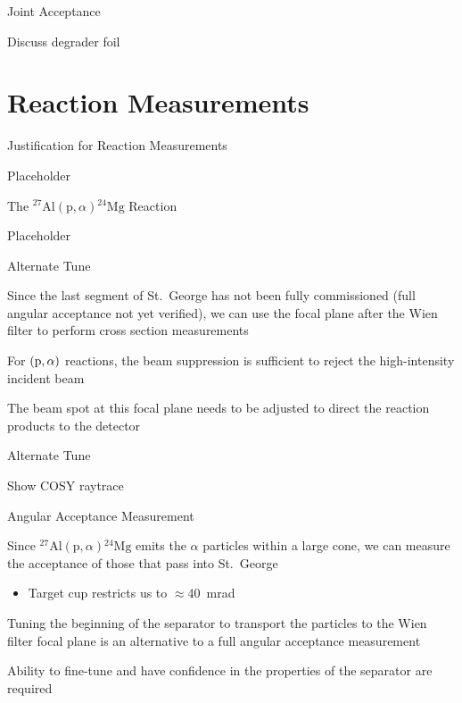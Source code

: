 \documentclass[10pt]{beamer}
\newcommand{\mnuc}[2]{{}^{#1}\textrm{#2}}
\newcommand{\react}[4]{$#1(#2,#3)#4$}
\newcommand{\alpa}{\react{\mnuc{27}{Al}}{\textrm{p}}{\alpha}{\mnuc{24}{Mg}}}
\begin{document}
\begin{frame}[fragile]{Joint Acceptance}

    Discuss degrader foil

\end{frame}

\section{Reaction Measurements}

\begin{frame}[fragile]{Justification for Reaction Measurements}

    Placeholder

\end{frame}

\begin{frame}[fragile]{The \alpa{} Reaction}

    Placeholder

\end{frame}

\begin{frame}[fragile]{Alternate Tune}

    Since the last segment of St.\ George has not been fully
    commissioned (full angular acceptance not yet verified), we can use
    the focal plane after the Wien filter to perform cross section
    measurements

    For $({\rm p},\alpha)$ reactions, the beam suppression is sufficient
    to reject the high-intensity incident beam

    The beam spot at this focal plane needs to be adjusted to direct the
    reaction products to the detector

\end{frame}

\begin{frame}[fragile]{Alternate Tune}

    Show COSY raytrace

\end{frame}

\begin{frame}[fragile]{Angular Acceptance Measurement}

    Since \alpa{} emits the $\alpha$ particles within a large cone, we
    can measure the acceptance of those that pass into St.\ George
    \begin{itemize}
        \item Target cup restricts us to $\approx 40$~mrad
    \end{itemize}

    Tuning the beginning of the separator to transport the particles to
    the Wien filter focal plane is an alternative to a full angular
    acceptance measurement

    Ability to fine-tune and have confidence in the properties of the
    separator are required

\end{frame}
\end{document}
